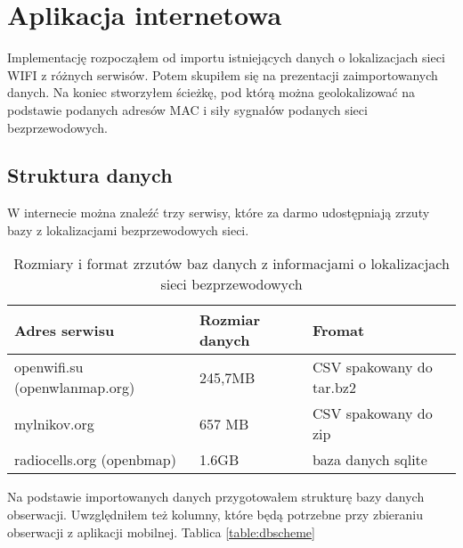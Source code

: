 \section{Aplikacja internetowa}
Implementację rozpocząłem od importu istniejących danych o lokalizacjach sieci WIFI z różnych serwisów. Potem skupiłem się na prezentacji zaimportowanych danych. Na koniec stworzyłem ścieżkę, pod którą można geolokalizować na podstawie podanych adresów MAC i siły sygnałów podanych sieci bezprzewodowych.

\subsection{Struktura danych}
W internecie można znaleźć trzy serwisy, które za darmo udostępniają zrzuty bazy z lokalizacjami bezprzewodowych sieci.

\begin{table}
\caption{Rozmiary i format zrzutów baz danych z informacjami o lokalizacjach sieci bezprzewodowych}
\label{table:wifilocationdatabases}
\begin{tabular}{ |l|l|l|  }
\hline
Adres serwisu & Rozmiar danych & Fromat \\
\hline
\hline
openwifi.su (openwlanmap.org) & 245,7MB & CSV spakowany do tar.bz2 \\
\hline
mylnikov.org & 657 MB & CSV spakowany do zip \\
\hline
radiocells.org (openbmap) & 1.6GB & baza danych sqlite \\
\hline
\end{tabular}
\end{table}

Na podstawie importowanych danych przygotowałem strukturę bazy danych obserwacji. Uwzględniłem też kolumny, które będą potrzebne przy zbieraniu obserwacji z aplikacji mobilnej. Tablica \ref{table:dbscheme}

